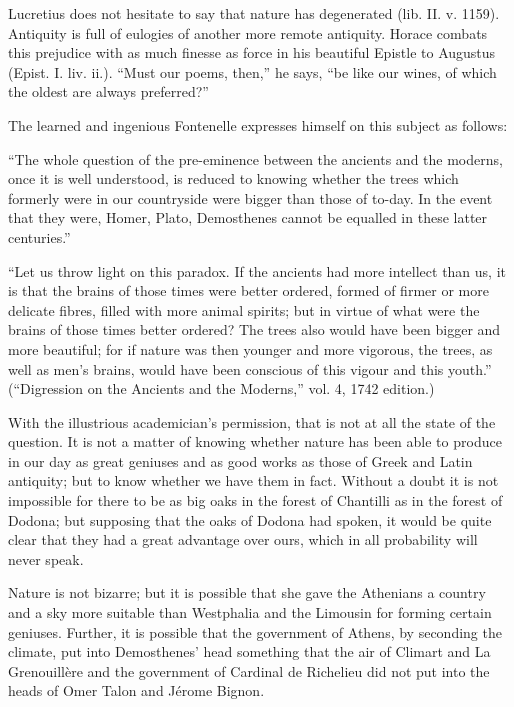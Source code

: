 Lucretius does not hesitate to say that nature has degenerated (lib. II.
v. 1159). Antiquity is full of eulogies of another more remote
antiquity. Horace combats this prejudice with as much finesse as force
in his beautiful Epistle to Augustus (Epist. I. liv. ii.). \enquote{Must our
poems, then,} he says, \enquote{be like our wines, of which the oldest are
always preferred?}

The learned and ingenious Fontenelle expresses himself on this subject
as follows:

\enquote{The whole question of the pre-eminence between the ancients and the
moderns, once it is well understood, is reduced to knowing whether the
trees which formerly were in our countryside were bigger than those of
to-day. In the event that they were, Homer, Plato, Demosthenes cannot
be equalled in these latter centuries.}

\enquote{Let us throw light on this paradox. If the ancients had more intellect
than us, it is that the brains of those times were better ordered,
formed of firmer or more delicate fibres, filled with more animal
spirits; but in virtue of what were the brains of those times better
ordered? The trees also would have been bigger and more beautiful; for
if nature was then younger and more vigorous, the trees, as well as
men's brains, would have been conscious of this vigour and this youth.}
(\enquote{Digression on the Ancients and the Moderns,} vol. 4, 1742 edition.)

With the illustrious academician's permission, that is not at all the
state of the question. It is not a matter of knowing whether nature has
been able to produce in our day as great geniuses and as good works as
those of Greek and Latin antiquity; but to know whether we have them in
fact. Without a doubt it is not impossible for there to be as big oaks
in the forest of Chantilli as in the forest of Dodona; but supposing
that the oaks of Dodona had spoken, it would be quite clear that they
had a great advantage over ours, which in all probability will never
speak.

Nature is not bizarre; but it is possible that she gave the Athenians a
country and a sky more suitable than Westphalia and the Limousin for
forming certain geniuses. Further, it is possible that the government of
Athens, by seconding the climate, put into Demosthenes' head something
that the air of Climart and La Grenouillère and the government of
Cardinal de Richelieu did not put into the heads of Omer Talon and
Jérome Bignon.

